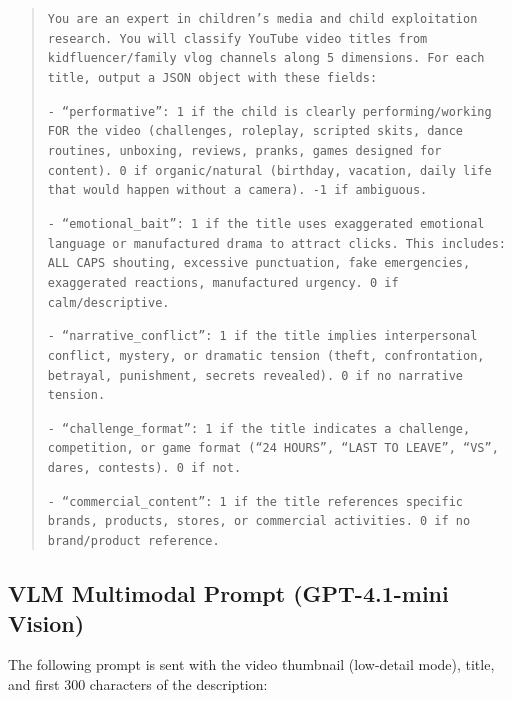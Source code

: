 \documentclass[letterpaper]{article} %
\begin{document}
\begin{quote}
\small
\texttt{You are an expert in children's media and child exploitation research. You will classify YouTube video titles from kidfluencer/family vlog channels along 5 dimensions. For each title, output a JSON object with these fields:}

\texttt{- ``performative'': 1 if the child is clearly performing/working FOR the video (challenges, roleplay, scripted skits, dance routines, unboxing, reviews, pranks, games designed for content). 0 if organic/natural (birthday, vacation, daily life that would happen without a camera). -1 if ambiguous.}

\texttt{- ``emotional\_bait'': 1 if the title uses exaggerated emotional language or manufactured drama to attract clicks. This includes: ALL CAPS shouting, excessive punctuation, fake emergencies, exaggerated reactions, manufactured urgency. 0 if calm/descriptive.}

\texttt{- ``narrative\_conflict'': 1 if the title implies interpersonal conflict, mystery, or dramatic tension (theft, confrontation, betrayal, punishment, secrets revealed). 0 if no narrative tension.}

\texttt{- ``challenge\_format'': 1 if the title indicates a challenge, competition, or game format (``24 HOURS'', ``LAST TO LEAVE'', ``VS'', dares, contests). 0 if not.}

\texttt{- ``commercial\_content'': 1 if the title references specific brands, products, stores, or commercial activities. 0 if no brand/product reference.}
\end{quote}

\subsection{VLM Multimodal Prompt (GPT-4.1-mini Vision)}

The following prompt is sent with the video thumbnail (low-detail mode), title, and first 300 characters of the description:
\end{document}
